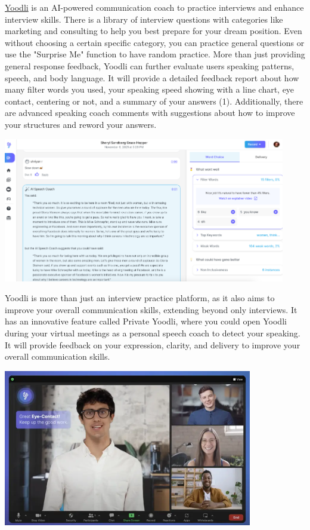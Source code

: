 \documentclass[
]{book}
\begin{document}
\href{https://app.yoodli.ai/}{Yoodli} is an AI-powered communication coach to practice interviews and enhance interview skills. There is a library of interview questions with categories like marketing and consulting to help you best prepare for your dream position. Even without choosing a certain specific category, you can practice general questions or use the "Surprise Me" function to have random practice. More than just providing general response feedback, Yoodli can further evaluate users\textquotesingle{} speaking patterns, speech, and body language. It will provide a detailed feedback report about how many filter words you used, your speaking speed showing with a line chart, eye contact, centering or not, and a summary of your answers (1). Additionally, there are advanced speaking coach comments with suggestions about how to improve your structures and reword your answers.

\includegraphics[width=4.85417in,height=\textheight]{yoodli pic 1.png}

Yoodli is more than just an interview practice platform, as it also aims to improve your overall communication skills, extending beyond only interviews. It has an innovative feature called Private Yoodli, where you could open Yoodli during your virtual meetings as a personal speech coach to detect your speaking. It will provide feedback on your expression, clarity, and delivery to improve your overall communication skills.

\includegraphics[width=4.28125in,height=\textheight]{yoodli pic 2.png}
\end{document}
